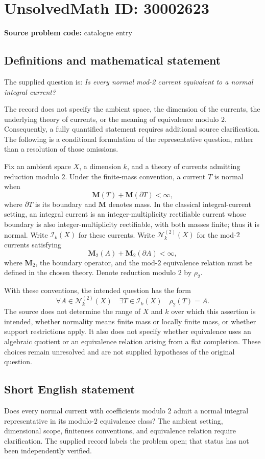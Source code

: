 \documentclass[11pt]{article}
\begin{document}
\section*{UnsolvedMath ID: 30002623}
\textbf{Source problem code:} catalogue entry
\subsection{Definitions and mathematical statement}
The supplied question is: \emph{Is every normal mod-2 current equivalent to a normal integral current?}

The record does not specify the ambient space, the dimension of the currents, the underlying theory of currents, or the meaning of equivalence modulo \(2\). Consequently, a fully quantified statement requires additional source clarification. The following is a conditional formulation of the representative question, rather than a resolution of those omissions.

Fix an ambient space \(X\), a dimension \(k\), and a theory of currents admitting reduction modulo \(2\). Under the finite-mass convention, a current \(T\) is normal when
\[
\mathbf M(T)+\mathbf M(\partial T)<\infty,
\]
where \(\partial T\) is its boundary and \(\mathbf M\) denotes mass. In the classical integral-current setting, an integral current is an integer-multiplicity rectifiable current whose boundary is also integer-multiplicity rectifiable, with both masses finite; thus it is normal. Write \(\mathcal I_k(X)\) for these currents. Write \(\mathcal N_k^{(2)}(X)\) for the mod-\(2\) currents satisfying
\[
\mathbf M_2(A)+\mathbf M_2(\partial A)<\infty,
\]
where \(\mathbf M_2\), the boundary operator, and the mod-\(2\) equivalence relation must be defined in the chosen theory. Denote reduction modulo \(2\) by \(\rho_2\).

With these conventions, the intended question has the form
\[
\forall A\in\mathcal N_k^{(2)}(X)\quad
\exists T\in\mathcal I_k(X)\quad \rho_2(T)=A.
\]
The source does not determine the range of \(X\) and \(k\) over which this assertion is intended, whether normality means finite mass or locally finite mass, or whether support restrictions apply. It also does not specify whether equivalence uses an algebraic quotient or an equivalence relation arising from a flat completion. These choices remain unresolved and are not supplied hypotheses of the original question.
\subsection{Short English statement}
Does every normal current with coefficients modulo \(2\) admit a normal integral representative in its modulo-\(2\) equivalence class? The ambient setting, dimensional scope, finiteness conventions, and equivalence relation require clarification. The supplied record labels the problem open; that status has not been independently verified.
\end{document}
